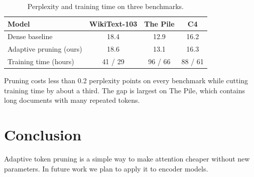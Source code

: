 \documentclass[11pt]{article}
\begin{document}
\begin{table}[!htb]
\centering
\caption{Perplexity and training time on three benchmarks.}
\label{tab:main}
\begin{tabular}{lccc}
\toprule
Model & WikiText-103 & The Pile & C4 \\
\midrule
Dense baseline & 18.4 & 12.9 & 16.2 \\
Adaptive pruning (ours) & 18.6 & 13.1 & 16.3 \\
\midrule
Training time (hours) & 41 / 29 & 96 / 66 & 88 / 61 \\
\bottomrule
\end{tabular}
\end{table}

Pruning costs less than 0.2 perplexity points on every benchmark while cutting training time by about
a third. The gap is largest on The Pile, which contains long documents with many repeated tokens.

\section{Conclusion}
Adaptive token pruning is a simple way to make attention cheaper without new parameters. In future work
we plan to apply it to encoder models.
\end{document}
